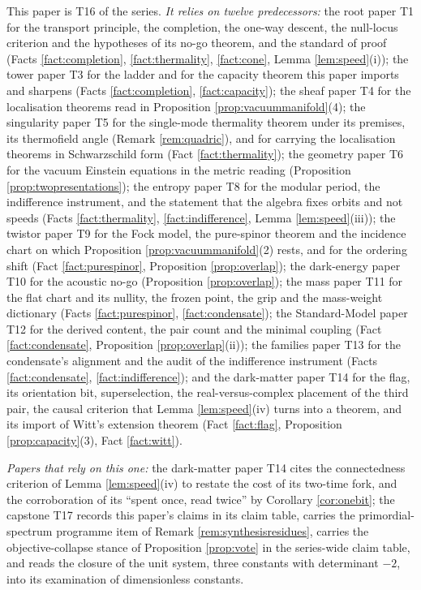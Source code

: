 \documentclass[11pt]{article}
\theoremstyle{definition}
\begin{document}
This paper is T16 of the series. \emph{It relies on twelve predecessors:} the root paper T1 \cite{ButlerT1} for the transport principle, the completion, the one-way descent, the null-locus criterion and the hypotheses of its no-go theorem, and the standard of proof (Facts \ref{fact:completion}, \ref{fact:thermality}, \ref{fact:cone}, Lemma \ref{lem:speed}(i)); the tower paper T3 \cite{ButlerT3} for the ladder and for the capacity theorem this paper imports and sharpens (Facts \ref{fact:completion}, \ref{fact:capacity}); the sheaf paper T4 \cite{ButlerT4} for the localisation theorems read in Proposition \ref{prop:vacuummanifold}(4); the singularity paper T5 \cite{ButlerT5} for the single-mode thermality theorem under its premises, its thermofield angle (Remark \ref{rem:quadric}), and for carrying the localisation theorems in Schwarzschild form (Fact \ref{fact:thermality}); the geometry paper T6 \cite{ButlerT6} for the vacuum Einstein equations in the metric reading (Proposition \ref{prop:twopresentations}); the entropy paper T8 \cite{ButlerT8} for the modular period, the indifference instrument, and the statement that the algebra fixes orbits and not speeds (Facts \ref{fact:thermality}, \ref{fact:indifference}, Lemma \ref{lem:speed}(iii)); the twistor paper T9 \cite{ButlerT9} for the Fock model, the pure-spinor theorem and the incidence chart on which Proposition \ref{prop:vacuummanifold}(2) rests, and for the ordering shift (Fact \ref{fact:purespinor}, Proposition \ref{prop:overlap}); the dark-energy paper T10 \cite{ButlerT10} for the acoustic no-go (Proposition \ref{prop:overlap}); the mass paper T11 \cite{ButlerT11} for the flat chart and its nullity, the frozen point, the grip and the mass-weight dictionary (Facts \ref{fact:purespinor}, \ref{fact:condensate}); the Standard-Model paper T12 \cite{ButlerT12} for the derived content, the pair count and the minimal coupling (Fact \ref{fact:condensate}, Proposition \ref{prop:overlap}(ii)); the families paper T13 \cite{ButlerT13} for the condensate's alignment and the audit of the indifference instrument (Facts \ref{fact:condensate}, \ref{fact:indifference}); and the dark-matter paper T14 \cite{ButlerT14} for the flag, its orientation bit, superselection, the real-versus-complex placement of the third pair, the causal criterion that Lemma \ref{lem:speed}(iv) turns into a theorem, and its import of Witt's extension theorem (Fact \ref{fact:flag}, Proposition \ref{prop:capacity}(3), Fact \ref{fact:witt}).

\emph{Papers that rely on this one:} the dark-matter paper T14 \cite{ButlerT14} cites the connectedness criterion of Lemma \ref{lem:speed}(iv) to restate the cost of its two-time fork, and the corroboration of its ``spent once, read twice'' by Corollary \ref{cor:onebit}; the capstone T17 \cite{ButlerT17} records this paper's claims in its claim table, carries the primordial-spectrum programme item of Remark \ref{rem:synthesisresidues}, carries the objective-collapse stance of Proposition \ref{prop:vote} in the series-wide claim table, and reads the closure of the unit system, three constants with determinant $-2$, into its examination of dimensionless constants.
\end{document}
